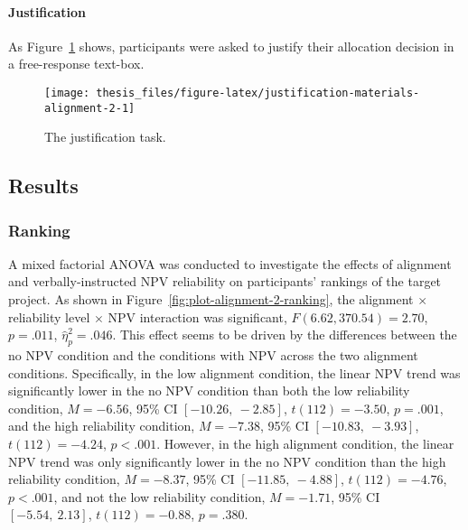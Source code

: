 \documentclass[a4paper, nobind]{templates/ociamthesis}
\theoremstyle{definition}
\theoremstyle{definition}
\theoremstyle{definition}
\theoremstyle{definition}
\theoremstyle{remark}
\begin{document}
\hypertarget{justification-materials-alignment-2}{%
\paragraph{Justification}\label{justification-materials-alignment-2}}

As Figure~\ref{fig:justification-materials-alignment-2} shows, participants
were asked to justify their allocation decision in a free-response text-box.



\begin{figure}
\texttt{[image: thesis\_files/figure-latex/justification-materials-alignment-2-1]} \caption{The justification task.}\label{fig:justification-materials-alignment-2}
\end{figure}

\hypertarget{results-alignment-2-appendix}{%
\subsection{Results}\label{results-alignment-2-appendix}}

\subsubsection{Ranking}

A mixed factorial ANOVA was conducted to investigate the effects of alignment
and verbally-instructed NPV reliability on participants' rankings of the
target project. As shown in Figure~\ref{fig:plot-alignment-2-ranking}, the
alignment \(\times\) reliability level \(\times\) NPV interaction was
significant,
\(F(6.62, 370.54) = 2.70\), \(p = .011\), \(\hat{\eta}^2_p = .046\). This
effect seems to be driven by the differences between the no NPV condition and
the conditions with NPV across the two alignment conditions. Specifically, in
the low alignment condition, the linear NPV trend was significantly lower in the
no NPV condition than both the low reliability condition,
\(M = -6.56\), 95\% CI \([-10.26,~-2.85]\), \(t(112) = -3.50\), \(p = .001\), and the high
reliability condition, \(M = -7.38\), 95\% CI \([-10.83,~-3.93]\), \(t(112) = -4.24\), \(p < .001\).
However, in the high alignment condition, the linear NPV trend was only
significantly lower in the no NPV condition than the high reliability condition,
\(M = -8.37\), 95\% CI \([-11.85,~-4.88]\), \(t(112) = -4.76\), \(p < .001\), and not the low
reliability condition, \(M = -1.71\), 95\% CI \([-5.54,~2.13]\), \(t(112) = -0.88\), \(p = .380\).
\end{document}
